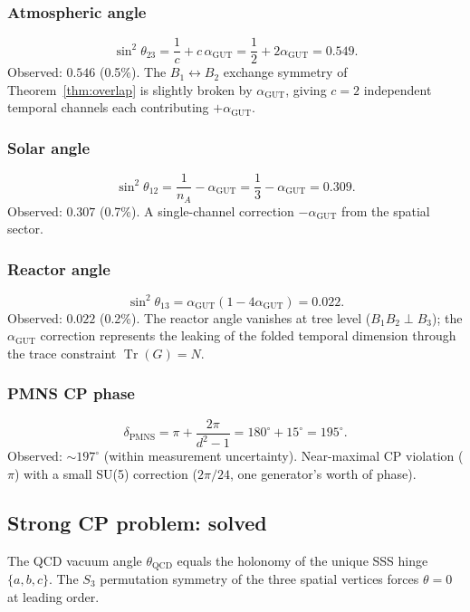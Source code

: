 \documentclass[12pt]{article}
\theoremstyle{remark}
\theoremstyle{definition}
\newcommand{\tr}{\operatorname{Tr}}
\newcommand{\agut}{\alpha_{\mathrm{GUT}}}
\begin{document}
\subsubsection{Atmospheric angle}
\begin{equation}
\sin^2\theta_{23} = \frac{1}{c} + c\,\agut = \frac{1}{2} + 2\agut = 0.549.
\end{equation}
Observed: $0.546$ (0.5\%). The $B_1 \leftrightarrow B_2$ exchange symmetry of Theorem~\ref{thm:overlap} is slightly broken by $\agut$, giving $c = 2$ independent temporal channels each contributing $+\agut$.

\subsubsection{Solar angle}
\begin{equation}
\sin^2\theta_{12} = \frac{1}{n_A} - \agut = \frac{1}{3} - \agut = 0.309.
\end{equation}
Observed: $0.307$ (0.7\%). A single-channel correction $-\agut$ from the spatial sector.

\subsubsection{Reactor angle}
\begin{equation}
\sin^2\theta_{13} = \agut(1 - 4\agut) = 0.022.
\end{equation}
Observed: $0.022$ (0.2\%). The reactor angle vanishes at tree level ($B_1 B_2 \perp B_3$); the $\agut$ correction represents the leaking of the folded temporal dimension through the trace constraint $\tr(G) = N$.

\subsubsection{PMNS CP phase}
\begin{equation}
\delta_\text{PMNS} = \pi + \frac{2\pi}{d^2 - 1} = 180^\circ + 15^\circ = 195^\circ.
\end{equation}
Observed: $\sim 197^\circ$ (within measurement uncertainty). Near-maximal CP violation ($\pi$) with a small SU(5) correction ($2\pi/24$, one generator's worth of phase).

\subsection{Strong CP problem: solved}

The QCD vacuum angle $\theta_\text{QCD}$ equals the holonomy of the unique SSS hinge $\{a, b, c\}$. The $S_3$ permutation symmetry of the three spatial vertices forces $\theta = 0$ at leading order.
\end{document}
